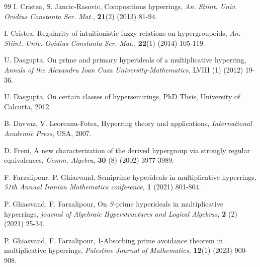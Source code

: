 \documentclass[preprint,review,10pt]{amsart}
\theoremstyle{definition}
\theoremstyle{remark}
\numberwithin{equation}{section}
\begin{document}
\begin{thebibliography}{99}
I. Cristea, S. Jancic-Rasovic, Compositions hyperrings, {\it An. Stiint. Univ. Ovidius Constanta Ser. Mat.,} {\bf 21}(2) (2013) 81-94.

I. Cristea, Regularity of intuitionistic fuzzy relations on hypergroupoids, {\it An. Stiint. Univ. Ovidius Constanta Ser. Mat.,} {\bf 22}(1) (2014)
105-119.

U. Dasgupta, On prime and primary hyperideals of a multiplicative hyperring, {\it Annals of the Alexandru Ioan Cuza
University-Mathematics,} LVIII (1) (2012) 19-36.

U. Dasgupta, On certain classes of hypersemirings, PhD Thsis, University of
Calcutta, 2012.




B. Davvaz, V. Leoreanu-Fotea, Hyperring theory and applications, {\it International Academic
Press}, USA, 2007.
  





D. Freni, A new characterization of the derived hypergroup via strongly
regular equivalences, {\it Comm. Algebra}, {\bf 30} (8) (2002) 3977-3989.
 

 
F. Farzalipour, P. Ghiasvand, Semiprime hyperideals in multiplicative hyperrings, {\it 51th Annual Iranian Mathematics conference,} {\bf 1} (2021) 801-804.
 

 
P. Ghiasvand, F. Farzalipour, On $S$-prime hyperideals in multiplicative hyperrings, {\it journal of Algebraic Hyperstructures
and Logical Algebras,} {\bf 2} (2) (2021) 25-34.


P. Ghiasvand, F. Farzalipour, 1-Absorbing prime avoidance theorem  in multiplicative hyperrings, {\it  Palestine Journal of Mathematics,} {\bf 12}(1) (2023) 900-908.
 

\end{thebibliography}
\end{document}
